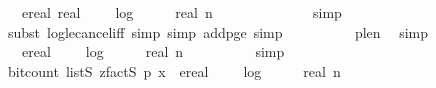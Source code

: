 \begin{isabellebody}
\ {\isachardoublequoteopen}{\isachardot}{\kern0pt}{\isachardot}{\kern0pt}{\isachardot}{\kern0pt}\ {\isasymle}\ ereal\ {\isacharparenleft}{\kern0pt}real\ {}\ {\isacharasterisk}{\kern0pt}\ {\isacharparenleft}{\kern0pt}{}\ {\isacharasterisk}{\kern0pt}\ log\ {}\ {\isacharparenleft}{\kern0pt}{}\ {\isacharplus}{\kern0pt}\ {}\ {\isacharasterisk}{\kern0pt}\ real\ n{\isacharparenright}{\kern0pt}\ {\isacharplus}{\kern0pt}\ {}{\isacharparenright}{\kern0pt}\ {\isacharplus}{\kern0pt}\ {}{\isacharparenright}{\kern0pt}{\isachardoublequoteclose}\isanewline
\ \ \ \ \ \ \ \ \isamarkupfalse%
\ simp\isanewline
\ \ \ \ \ \ \ \ \isamarkupfalse%
\ {\isacharparenleft}{\kern0pt}subst\ log{\isacharunderscore}{\kern0pt}le{\isacharunderscore}{\kern0pt}cancel{\isacharunderscore}{\kern0pt}iff{\isacharcomma}{\kern0pt}\ simp{\isacharcomma}{\kern0pt}\ simp\ add{\isacharcolon}{\kern0pt}p{\isacharunderscore}{\kern0pt}ge{\isacharunderscore}{\kern0pt}{}{\isacharcomma}{\kern0pt}\ simp{\isacharparenright}{\kern0pt}\isanewline
\ \ \ \ \ \ \ \ \isamarkupfalse%
\ p{\isacharunderscore}{\kern0pt}le{\isacharunderscore}{\kern0pt}n\ \isamarkupfalse%
\ simp\isanewline
\ \ \ \ \ \ \isamarkupfalse%
\ \isamarkupfalse%
\ {\isachardoublequoteopen}{\isachardot}{\kern0pt}{\isachardot}{\kern0pt}{\isachardot}{\kern0pt}\ {\isasymle}\ ereal\ {\isacharparenleft}{\kern0pt}{}\ {\isacharplus}{\kern0pt}\ {}\ {\isacharasterisk}{\kern0pt}\ log\ {}\ {\isacharparenleft}{\kern0pt}{}\ {\isacharplus}{\kern0pt}\ {}\ {\isacharasterisk}{\kern0pt}\ real\ n{\isacharparenright}{\kern0pt}{\isacharparenright}{\kern0pt}{\isachardoublequoteclose}\isanewline
\ \ \ \ \ \ \ \ \isamarkupfalse%
\ simp\isanewline
\ \ \ \ \ \ \isamarkupfalse%
\ \isamarkupfalse%
\ {\isachardoublequoteopen}bit{\isacharunderscore}{\kern0pt}count\ {\isacharparenleft}{\kern0pt}list\isactrlsub S\ {\isacharparenleft}{\kern0pt}zfact\isactrlsub S\ p{\isacharparenright}{\kern0pt}\ x{\isacharparenright}{\kern0pt}\ {\isasymle}\ ereal\ {\isacharparenleft}{\kern0pt}{}\ {\isacharplus}{\kern0pt}\ {}\ {\isacharasterisk}{\kern0pt}\ log\ {}\ {\isacharparenleft}{\kern0pt}{}\ {\isacharplus}{\kern0pt}\ {}\ {\isacharasterisk}{\kern0pt}\ real\ n{\isacharparenright}{\kern0pt}{\isacharparenright}{\kern0pt}{\isachardoublequoteclose}\isanewline

\end{isabellebody}
